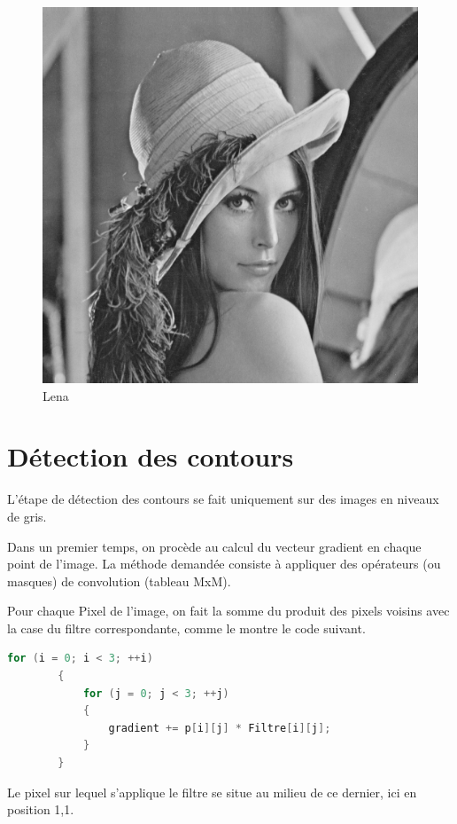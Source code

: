 \documentclass[11pt]{article}
\begin{document}
	\begin{figure}[H]
		\centering
		\includegraphics[scale=0.20]{Image/lena.png}
		\caption{Lena}
		\label{fig:Lena}
	\end{figure}

\section{Détection des contours}
	
	L'étape de détection des contours se fait uniquement sur des images en niveaux de gris.

	Dans un premier temps, on procède au calcul du vecteur gradient en chaque point de l'image.
	La méthode demandée consiste à appliquer des opérateurs (ou masques) de convolution (tableau MxM).

	Pour chaque Pixel de l'image, on fait la somme du produit des pixels voisins avec la case du filtre correspondante, comme le montre le code suivant.

	\begin{lstlisting}[caption={filtre.h},language=C++,label=filtreh]
		for (i = 0; i < 3; ++i)
		{
			for (j = 0; j < 3; ++j)
			{ 
				gradient += p[i][j] * Filtre[i][j];	
			}
		}
	\end{lstlisting}
	Le pixel sur lequel s'applique le filtre se situe au milieu de ce dernier, ici en position 1,1.
\end{document}

